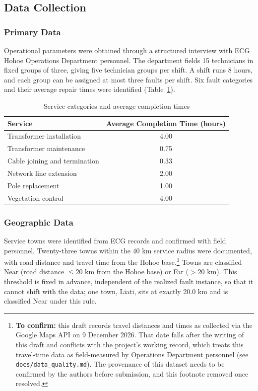 \documentclass[11pt]{article}
\begin{document}
\subsection*{Data Collection}
\subsubsection*{Primary Data}
Operational parameters were obtained through a structured interview with ECG Hohoe Operations Department personnel. The department fields 15 technicians in fixed groups of three, giving five technician groups per shift. A shift runs 8 hours, and each group can be assigned at most three faults per shift. Six fault categories and their average repair times were identified (Table~\ref{tab:services}).

\begin{table}[H]
\centering
\caption{Service categories and average completion times}
\label{tab:services}
\begin{tabular}{l c}
\toprule
Service & Average Completion Time (hours) \\
\midrule
Transformer installation & 4.00 \\
Transformer maintenance & 0.75 \\
Cable joining and termination & 0.33 \\
Network line extension & 2.00 \\
Pole replacement & 1.00 \\
Vegetation control & 4.00 \\
\bottomrule
\end{tabular}
\end{table}

\subsubsection*{Geographic Data}

Service towns were identified from ECG records and confirmed with field personnel. Twenty-three towns within the 40 km service radius were documented, with road distance and travel time from the Hohoe base.\footnote{\textbf{To confirm:} this draft records travel distances and times as collected via the Google Maps API on 9 December 2026. That date falls after the writing of this draft and conflicts with the project's working record, which treats this travel-time data as field-measured by Operations Department personnel (see \texttt{docs/data\_quality.md}). The provenance of this dataset needs to be confirmed by the authors before submission, and this footnote removed once resolved.} Towns are classified Near (road distance $\leq 20$ km from the Hohoe base) or Far ($> 20$ km). This threshold is fixed in advance, independent of the realized fault instance, so that it cannot shift with the data; one town, Liati, sits at exactly 20.0 km and is classified Near under this rule.
\end{document}
